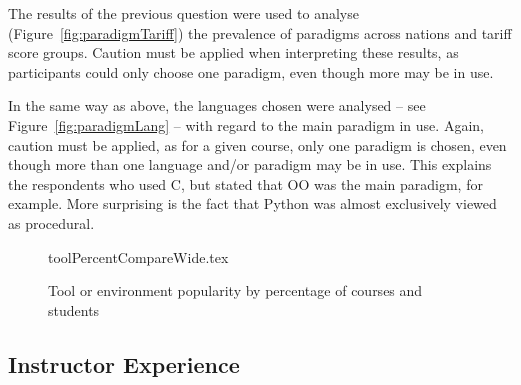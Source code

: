 \documentclass[english,submission]{programming}
\begin{document}
The results of the previous question were used to analyse
(Figure~\ref{fig:paradigmTariff}) the prevalence of paradigms across
nations and tariff score groups. Caution must be applied when
interpreting these results, as participants could only choose one
paradigm, even though more may be in use.


In the same way as above, the languages chosen were analysed -- see
Figure~\ref{fig:paradigmLang} -- with regard to the main paradigm in
use. Again, caution must be applied, as for a given course, only one
paradigm is chosen, even though more than one language and/or paradigm
may be in use. This explains the respondents who used C, but stated
that OO was the main paradigm, for example. More surprising is the
fact that Python was almost exclusively viewed as procedural.


%

\begin{figure}
\begin{center}
{toolPercentCompareWide.tex}
\caption{Tool or environment popularity by percentage of courses and students\label{fig:tools}}
\end{center}
\end{figure}

\subsection{Instructor Experience}
\end{document}
